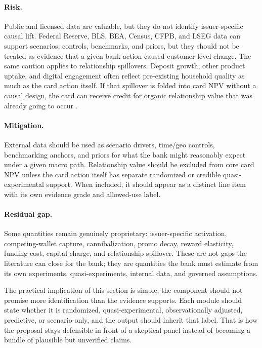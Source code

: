 \documentclass[11pt]{article}
\newcommand{\1}{\mathbf{1}}
\begin{document}
\paragraph{Risk.}
Public and licensed data are valuable, but they do not identify issuer-specific
causal lift. Federal Reserve, BLS, BEA, Census, CFPB, and LSEG data can
support scenarios, controls, benchmarks, and priors, but they should not be
treated as evidence that a given bank action caused customer-level change.
The same caution applies to relationship spillovers. Deposit growth, other
product uptake, and digital engagement often reflect pre-existing household
quality as much as the card action itself. If that spillover is folded into
card NPV without a causal design, the card can receive credit for organic
relationship value that was already going to occur
\citep{federalreserveEFA,federalreserveG19,federalreserveZ1,nyfedHhdc,
blsLAUS,beaRegional,censusACS,cfpbCreditCardData,fredALFRED,lsegWorkspace,
lsegEconomicData}.

\paragraph{Mitigation.}
External data should be used as scenario drivers, time/geo controls,
benchmarking anchors, and priors for what the bank might reasonably expect
under a given macro path. Relationship value should be excluded from core
card NPV unless the card action itself has separate randomized or credible
quasi-experimental support. When included, it should appear as a distinct line
item with its own evidence grade and allowed-use label.

\paragraph{Residual gap.}
Some quantities remain genuinely proprietary: issuer-specific activation,
competing-wallet capture, cannibalization, promo decay, reward elasticity,
funding cost, capital charge, and relationship spillover. These are not gaps
the literature can close for the bank; they are quantities the bank must
estimate from its own experiments, quasi-experiments, internal data, and
governed assumptions.

The practical implication of this section is simple: the component should not
promise more identification than the evidence supports. Each module should
state whether it is randomized, quasi-experimental, observationally adjusted,
predictive, or scenario-only, and the output should inherit that label. That
is how the proposal stays defensible in front of a skeptical panel instead of
becoming a bundle of plausible but unverified claims.
\end{document}
